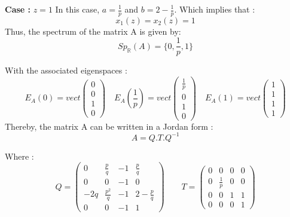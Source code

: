 \documentclass{article}
\begin{document}
\begin{flushleft}
\textbf{Case :}  $z = 1$ 
\medbreak
In this case,  $ a= \frac{1}{p} $ and $ b= 2- \frac{1}{p}$. Which implies that :
\begin{equation}
x_{1}(z) = x_{2}(z) = 1
\end{equation}
Thus, the spectrum of the matrix A is given by: 
\begin{equation}
Sp_{\mathbb{R}}(A) =\{0,\frac{1}{p},1\}
\end{equation}

With the associated eigenspaces  :
$$
 E_{A}(0) = vect
 \begin{pmatrix} 
 0\\
 0\\
 1\\
 0
 \end{pmatrix}
 \quad
 E_{A}(\frac{1}{p}) = vect
 \begin{pmatrix} 
 \frac{1}{p}\\
 0\\
 1\\
 0
 \end{pmatrix}
 \quad
 E_{A}(1) = vect
 \begin{pmatrix} 
 1\\
 1\\
 1\\
 1
 \end{pmatrix} 
$$
Thereby, the matrix A can be written in a Jordan form :
\begin{equation}
A = Q.T.Q^{-1}
\end{equation}

Where :
\begin{equation}
Q = 
\begin{pmatrix} 
0 & \frac{p}{q} &  -1 &  \frac{p}{q} \\
0 & 0 & -1 & 0 \\
-2q & \frac{p^{2}}{q} &  -1 &  2-\frac{p}{q}\\
0 & 0 &  -1 & 1
\end{pmatrix}
\quad \quad
T = 
\begin{pmatrix} 
0 & 0 & 0 &  0 \\
0 & \frac{1}{p} & 0 & 0\\
0 & 0 & 1 &  1\\
0 & 0 &  0&  1
\end{pmatrix}
\end{equation}
\end{flushleft}
\end{document}
